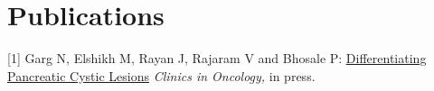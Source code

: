 \documentclass[]{deedy-resume-openfont}
\begin{document}
\begin{minipage}[t]{0.66\textwidth}

\section{Publications} 
\vspace{2 mm}
[1] Garg N, Elshikh M, Rayan J, Rajaram V and Bhosale P: \underline{\href{https://www.clinicsinoncology.com/pdfs_folder/cio-v1-id1088.pdf}{Differentiating Pancreatic Cystic Lesions}} \textit{Clinics in Oncology,} in press.

\nocite{*}

\end{minipage} 
\end{document}
